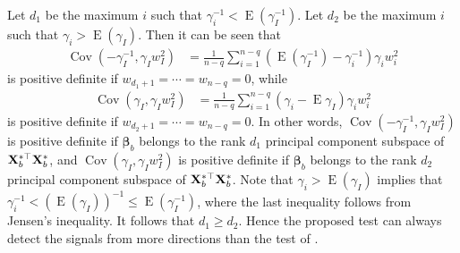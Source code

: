 \documentclass[smallextended]{svjour3}       %
\DeclareMathOperator{\myE}{E}
\DeclareMathOperator{\myCov}{Cov}
\newcommand{\By}{\mathbf{y}}    \newcommand{\Bz}{\mathbf{z}}
\newcommand{\bfsym}[1]{\ensuremath{\boldsymbol{#1}}}
\def\bbeta{\bfsym \beta}
\begin{document}
Let $d_1$ be the maximum $i$ such that $ \gamma_i^{-1} < \myE (\gamma_I^{-1})$.
Let $d_2$ be the maximum $i$ such that $\gamma_i > \myE (\gamma_I) $.
Then it can be seen that
\begin{align*}
\myCov (-\gamma_I^{-1}, \gamma_I w_I^2)
&=
\frac{1}{n-q} \sum_{i=1}^{n-q} \left(\myE (\gamma_I^{-1})-\gamma_i^{-1} \right) \gamma_i w_i^2
\end{align*}
is positive definite if $w_{d_1+1}=\cdots =w_{n-q}=0$, while
\begin{align*}
    \myCov(\gamma_I, \gamma_I w_I^2)
&=
\frac{1}{n-q} \sum_{i=1}^{n-q} \left(\gamma_i - \myE \gamma_I \right) \gamma_i w_i^2
\end{align*}
is positive definite if $w_{d_2 + 1}=\cdots = w_{n-q}=0$.
In other words, $\myCov(-\gamma_I^{-1}, \gamma_I w_I^2)$ is positive definite if $\bbeta_b$ belongs to the rank $d_1$ principal component subspace of $\mathbf{X}_{b}^{*\top}\mathbf{X}_b^{*}$, and $\myCov(\gamma_I, \gamma_I w_I^2)$ is positive definite if $\bbeta_b$ belongs to the rank $d_2$ principal component subspace of $\mathbf{X}_{b}^{*\top}\mathbf{X}_b^{*}$.
Note that $\gamma_i > \myE (\gamma_I)$ implies that $\gamma_i^{-1} < (\myE (\gamma_I))^{-1}\leq \myE (\gamma_I^{-1})$, where the last inequality follows from Jensen's inequality.
It follows that $ d_1 \geq d_2 $.
Hence the proposed test can always detect the signals from more directions than the test of \cite{Goeman2006}.

\end{document}
